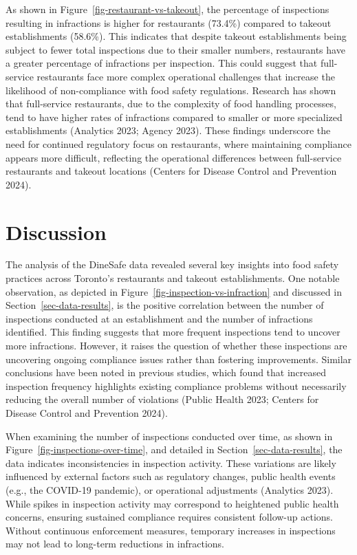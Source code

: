 \documentclass[
  letterpaper,
  DIV=11,
  numbers=noendperiod]{scrartcl}
\begin{document}
As shown in Figure~\ref{fig-restaurant-vs-takeout}, the percentage of
inspections resulting in infractions is higher for restaurants (73.4\%)
compared to takeout establishments (58.6\%). This indicates that despite
takeout establishments being subject to fewer total inspections due to
their smaller numbers, restaurants have a greater percentage of
infractions per inspection. This could suggest that full-service
restaurants face more complex operational challenges that increase the
likelihood of non-compliance with food safety regulations. Research has
shown that full-service restaurants, due to the complexity of food
handling processes, tend to have higher rates of infractions compared to
smaller or more specialized establishments (Analytics 2023; Agency
2023). These findings underscore the need for continued regulatory focus
on restaurants, where maintaining compliance appears more difficult,
reflecting the operational differences between full-service restaurants
and takeout locations (Centers for Disease Control and Prevention 2024).

\newpage

\section{Discussion}\label{sec-discussion}

The analysis of the DineSafe data revealed several key insights into
food safety practices across Toronto's restaurants and takeout
establishments. One notable observation, as depicted in
Figure~\ref{fig-inspection-vs-infraction} and discussed in
Section~\ref{sec-data-results}, is the positive correlation between the
number of inspections conducted at an establishment and the number of
infractions identified. This finding suggests that more frequent
inspections tend to uncover more infractions. However, it raises the
question of whether these inspections are uncovering ongoing compliance
issues rather than fostering improvements. Similar conclusions have been
noted in previous studies, which found that increased inspection
frequency highlights existing compliance problems without necessarily
reducing the overall number of violations (Public Health 2023; Centers
for Disease Control and Prevention 2024).

When examining the number of inspections conducted over time, as shown
in Figure~\ref{fig-inspections-over-time}, and detailed in
Section~\ref{sec-data-results}, the data indicates inconsistencies in
inspection activity. These variations are likely influenced by external
factors such as regulatory changes, public health events (e.g., the
COVID-19 pandemic), or operational adjustments (Analytics 2023). While
spikes in inspection activity may correspond to heightened public health
concerns, ensuring sustained compliance requires consistent follow-up
actions. Without continuous enforcement measures, temporary increases in
inspections may not lead to long-term reductions in infractions.
\end{document}
